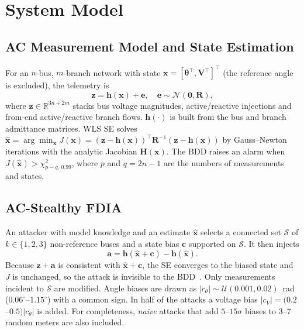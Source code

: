 \section{System Model}
\subsection{AC Measurement Model and State Estimation}
For an $n$-bus, $m$-branch network with state $\mathbf{x}=[\boldsymbol{\theta}^{\top},\mathbf{V}^{\top}]^{\top}$ (the reference angle is excluded), the telemetry is
\begin{equation}
\mathbf{z}=\mathbf{h}(\mathbf{x})+\mathbf{e},\quad \mathbf{e}\sim\mathcal{N}(\mathbf{0},\mathbf{R}),
\end{equation}
where $\mathbf{z}\in\mathbb{R}^{3n+2m}$ stacks bus voltage magnitudes, active/reactive injections and from-end active/reactive branch flows. $\mathbf{h}(\cdot)$ is built from the bus and branch admittance matrices. WLS SE solves $\hat{\mathbf{x}}=\arg\min_{\mathbf{x}} J(\mathbf{x})=(\mathbf{z}-\mathbf{h}(\mathbf{x}))^{\top}\mathbf{R}^{-1}(\mathbf{z}-\mathbf{h}(\mathbf{x}))$ by Gauss--Newton iterations with the analytic Jacobian $\mathbf{H}(\mathbf{x})$. The BDD raises an alarm when $J(\hat{\mathbf{x}})>\chi^2_{p-q,\,0.99}$, where $p$ and $q=2n-1$ are the numbers of measurements and states.

\subsection{AC-Stealthy FDIA}
An attacker with model knowledge and an estimate $\hat{\mathbf{x}}$ selects a connected set $\mathcal{S}$ of $k\in\{1,2,3\}$ non-reference buses and a state bias $\mathbf{c}$ supported on $\mathcal{S}$. It then injects
\begin{equation}
\mathbf{a}=\mathbf{h}(\hat{\mathbf{x}}+\mathbf{c})-\mathbf{h}(\hat{\mathbf{x}}).\label{eq:attack}
\end{equation}
Because $\mathbf{z}+\mathbf{a}$ is consistent with $\hat{\mathbf{x}}+\mathbf{c}$, the SE converges to the biased state and $J$ is unchanged, so the attack is invisible to the BDD~\cite{liu2009fdia,hug2012ac}. Only measurements incident to $\mathcal{S}$ are modified. Angle biases are drawn as $|c_{\theta}|\sim\mathcal{U}(0.001,0.02)$~rad ($0.06^\circ$--$1.15^\circ$) with a common sign. In half of the attacks a voltage bias $|c_V|=(0.2$--$0.5)|c_\theta|$ is added. For completeness, \emph{naive} attacks that add $5$--$15\sigma$ biases to 3--7 random meters are also included.

